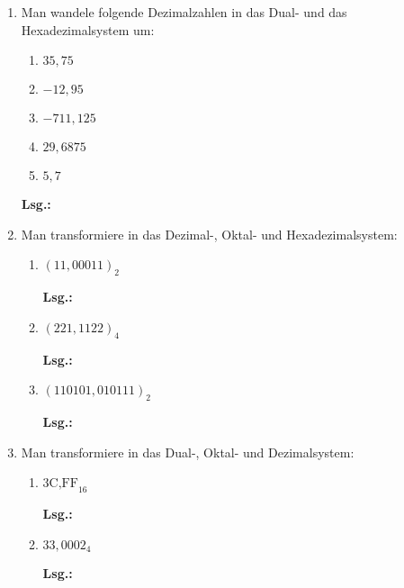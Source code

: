 \documentclass[12pt,a4paper]{scrreprt}
\newcommand{\Lsg}{\par \textbf{Lsg.: }}
\begin{document}
\begin{enumerate}
\begin{lstlisting}
printf(" max. signed long-Wert = \% 20ld \% 20lX\\n", slo, slo);
\end{lstlisting}

\Lsg%

\item Man wandele folgende Dezimalzahlen in das Dual- und das Hexadezimalsystem um:

\begin{enumerate}
\item $3 5 ,75$
\item $-12,95$
\item $-711,125$
\item $29,6875$
\item $5,7$
\end{enumerate}

\Lsg%

\item Man transformiere in das Dezimal-, Oktal- und Hexadezimalsystem:

\begin{enumerate}
\item $(11,00011)_2$

\Lsg%

\item $(221,1122)_4$

\Lsg%

\item $(110101,010111)_2$

\Lsg%

\end{enumerate}

\item Man transformiere in das Dual-, Oktal- und Dezimalsystem:

\begin{enumerate}
\item $\text{3C,FF}_{16}$

\Lsg%

\item $33,0002_4$

\Lsg%


\end{enumerate}
\end{enumerate}
\end{document}
